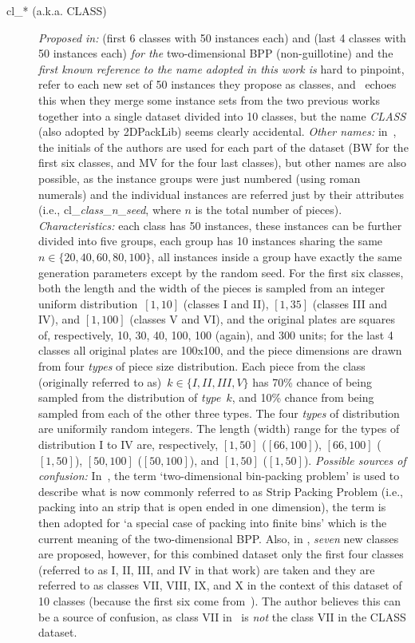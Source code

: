 \documentclass[ppgc,tese,english,formais,babel]{iiufrgs}
\begin{document}
\begin{description}
\item[cl\_* (a.k.a. CLASS)] \emph{Proposed in:} \citet{berkey:1987} (first 6 classes with 50 instances each) and \citet{martello:1998} (last 4 classes with 50 instances each) \emph{for the} two-dimensional BPP (non-guillotine) and the \emph{first known reference to the name adopted in this work is} hard to pinpoint, \citet{martello:1998} refer to each new set of 50 instances they propose as classes, and~\citet{boschetti:2003} echoes this when they merge some instance sets from the two previous works together into a single dataset divided into 10 classes, but the name \emph{CLASS} (also adopted by 2DPackLib) seems clearly accidental. \emph{Other names:} in~\cite{alvelos:2009}, the initials of the authors are used for each part of the dataset (BW for the first six classes, and MV for the four last classes), but other names are also possible, as the instance groups were just numbered (using roman numerals) and the individual instances are referred just by their attributes (i.e., cl\_\emph{class}\_\emph{n}\_\emph{seed}, where \(n\) is the total number of pieces). \emph{Characteristics:} each class has 50 instances, these instances can be further divided into five groups, each group has 10 instances sharing the same~\(n \in \{20, 40, 60, 80, 100\}\), all instances inside a group have exactly the same generation parameters except by the random seed. For the first six classes, both the length and the width of the pieces is sampled from an integer uniform distribution~\([1, 10]\) (classes I and II), \([1, 35]\) (classes III and IV), and \([1, 100]\) (classes V and VI), and the original plates are squares of, respectively, 10, 30, 40, 100, 100 (again), and 300 units; for the last 4 classes all original plates are 100x100, and the piece dimensions are drawn from four \emph{types} of piece size distribution. Each piece from the class (originally referred to as)~\(k \in \{I, II, III, V\}\) has 70\% chance of being sampled from the distribution of \emph{type}~\(k\), and 10\% chance from being sampled from each of the other three types. The four \emph{types} of distribution are uniformily random integers. The length (width) range for the types of distribution I to IV are, respectively, \([1, 50]\) (\([66, 100]\)), \([66, 100]\) (\([1, 50]\)), \([50, 100]\) (\([50, 100]\)), and \([1, 50]\) (\([1, 50]\)). \emph{Possible sources of confusion:} In~\citet{berkey:1987}, the term `two-dimensional bin-packing problem' is used to describe what is now commonly referred to as Strip Packing Problem (i.e., packing into an strip that is open ended in one dimension), the term is then adopted for `a special case of packing into finite bins' which is the current meaning of the two-dimensional BPP. Also, in \citet{martello:1998}, \emph{seven} new classes are proposed, however, for this combined dataset only the first four classes (referred to as I, II, III, and IV in that work) are taken and they are referred to as classes VII, VIII, IX, and X in the context of this dataset of 10 classes (because the first six come from~\citet{berkey:1987}). The author believes this can be a source of confusion, as class VII in~\citet{martello:1998} is \emph{not} the class VII in the CLASS dataset.

\end{description}
\end{document}

